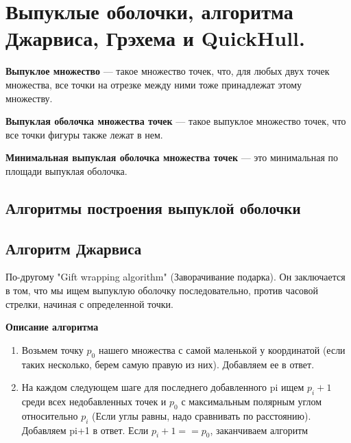 \section{Выпуклые оболочки, алгоритма Джарвиса, Грэхема и QuickHull.}

\begin{definition}
	\textbf{Выпуклое множество} --- такое множество точек, что, для любых двух точек множества, все точки на отрезке между ними тоже принадлежат этому множеству.
\end{definition}

\begin{definition}
	\textbf{Выпуклая оболочка множества точек} --- такое выпуклое множество точек, что все точки фигуры также лежат в нем.
\end{definition}

\begin{definition}
	\textbf{Минимальная выпуклая оболочка множества точек} --- это минимальная по площади выпуклая оболочка.
\end{definition}

\subsection*{Алгоритмы построения выпуклой оболочки}

\subsection{Алгоритм Джарвиса}
По-другому "Gift wrapping algorithm" (Заворачивание подарка). Он заключается в том, что мы ищем выпуклую оболочку последовательно, против часовой стрелки, начиная с определенной точки.

\textbf{Описание алгоритма}

\begin{enumerate}
	\item Возьмем точку $p_0$ нашего множества с самой маленькой $у$ координатой (если таких несколько, берем самую правую из них). 
	Добавляем ее в ответ.
	\item На каждом следующем шаге для последнего добавленного pi
	ищем $p_i+1$ среди всех недобавленных точек и $p_0$
	с максимальным полярным углом относительно $p_i$ (Если углы равны, надо сравнивать по расстоянию). Добавляем pi+1 в ответ. 
	Если $p_i+1==p_0$, заканчиваем алгоритм
\end{enumerate}

